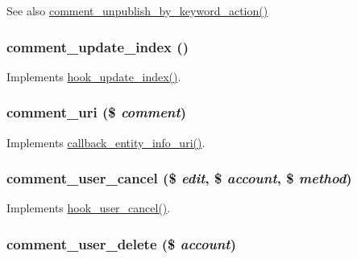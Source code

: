 \begin{DoxySeeAlso}{See also}
\hyperlink{group__actions_gaf5c19c791a33e0dc2b0bd3eb4fa79ba5}{comment\_\-unpublish\_\-by\_\-keyword\_\-action()} 
\end{DoxySeeAlso}
\hypertarget{comment_8module_a50b866fc4c5da2c4a30a84ef4e2aac2d}{
\subsubsection[{comment\_\-update\_\-index}]{\setlength{\rightskip}{0pt plus 5cm}comment\_\-update\_\-index ()}}
\label{comment_8module_a50b866fc4c5da2c4a30a84ef4e2aac2d}
Implements \hyperlink{group__search_ga23d6f6642bd53c4f033f10e9c1b12d43}{hook\_\-update\_\-index()}. \hypertarget{comment_8module_a40e0250c18ea32c201bb1abef9bb1a0a}{
\subsubsection[{comment\_\-uri}]{\setlength{\rightskip}{0pt plus 5cm}comment\_\-uri (\$ {\em comment})}}
\label{comment_8module_a40e0250c18ea32c201bb1abef9bb1a0a}
Implements \hyperlink{group__callbacks_ga42bf4e69ee32b2bc99d0d774d4917254}{callback\_\-entity\_\-info\_\-uri()}. \hypertarget{comment_8module_a8a9c4215c802259786fcb2a5526a1313}{
\subsubsection[{comment\_\-user\_\-cancel}]{\setlength{\rightskip}{0pt plus 5cm}comment\_\-user\_\-cancel (\$ {\em edit}, \/  \$ {\em account}, \/  \$ {\em method})}}
\label{comment_8module_a8a9c4215c802259786fcb2a5526a1313}
Implements \hyperlink{group__hooks_gad6223ddd2f0f52c331df8a3315d9a41e}{hook\_\-user\_\-cancel()}. \hypertarget{comment_8module_a9534e778a7cbfe56fd750997c8998ad8}{
\subsubsection[{comment\_\-user\_\-delete}]{\setlength{\rightskip}{0pt plus 5cm}comment\_\-user\_\-delete (\$ {\em account})}}
